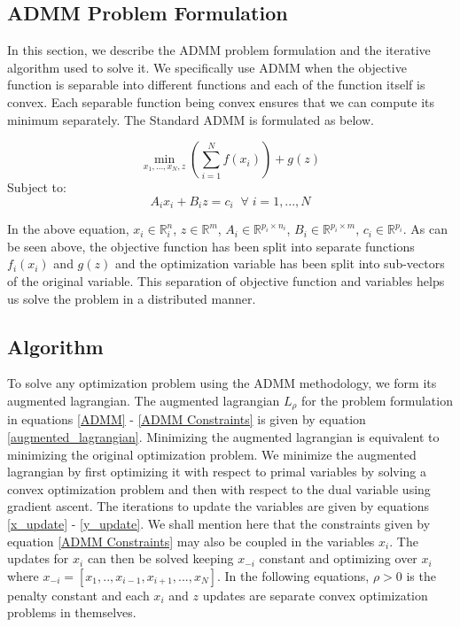 \documentclass[letterpaper, 10 pt, conference]{ieeeconf}  %
\begin{document}
\subsection{ADMM Problem Formulation}

In this section, we describe the ADMM problem formulation and the iterative algorithm used to solve it. We specifically use ADMM when the objective function is separable into different functions and each of the function itself is convex. Each separable function being convex ensures that we can compute its minimum separately. The Standard ADMM is formulated as below.

\begin{equation} \label{ADMM}
\min_{x_1, ..., x_N,z} \left(\sum\limits_{i=1}^{N} f(x_i)\right) + g(z) 
\end{equation}
Subject to:
\begin{equation}   \label{ADMM Constraints}
A_ix_i + B_iz = c_i \;\; \forall \; i = 1,...,N
\end{equation}  

In the above equation, $x_i \in \mathbb{R}^n_i$, $z \in \mathbb{R}^m$, $A_i \in \mathbb{R}^{p_i \times n_i}$, $B_i \in \mathbb{R}^{p_i \times m}$, $c_i \in \mathbb{R}^{p_i}$. As can be seen above, the objective function has been split into separate functions $f_i(x_i)$ and $g(z)$ and the optimization variable has been split into sub-vectors of the original variable. This separation of objective function and variables helps us solve the problem in a distributed manner.

\subsection{Algorithm} 

To solve any optimization problem using the ADMM methodology, we form its augmented lagrangian. The augmented lagrangian $L_{\rho}$ for the problem formulation in equations \ref{ADMM} - \ref{ADMM Constraints} is given by equation \ref{augmented_lagrangian}. Minimizing the augmented lagrangian is equivalent to minimizing the original optimization problem. We minimize the augmented lagrangian by first optimizing it with respect to primal variables by solving a convex optimization problem and then with respect to the dual variable using gradient ascent. The iterations to update the variables are given by equations \ref{x_update} - \ref{y_update}. We shall mention here that the constraints given by equation \ref{ADMM Constraints} may also be coupled in the variables $x_i$. The updates for $x_i$ can then be solved keeping $x_{-i}$ constant and optimizing over $x_i$ where $x_{-i} = [x_1,..,x_{i-1},x_{i+1},...,x_N]$. In the following equations, $\rho > 0$ is the penalty constant and each $x_i$ and $z$ updates are separate convex optimization problems in themselves. 
\end{document}
